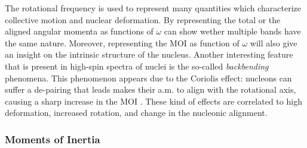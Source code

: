 The rotational frequency is used to represent many quantities which characterize collective motion and nuclear deformation. By representing the total or the aligned angular momenta as functions of $\omega$ can show wether multiple bands have the same nature. Moreover, representing the MOI as function of $\omega$ will also give an insight on the intrinsic structure of the nucleus. Another interesting feature that is present in high-spin spectra of nuclei is the so-called \emph{backbending} phenomena. This phenomenon appears due to the Coriolis effect: nucleons can suffer a de-pairing that leads makes their a.m. to align with the rotational axis, causing a sharp increase in the MOI \cite{ring2004nuclear,kvasil2004backbending}. These kind of effects are correlated to high deformation, increased rotation, and change in the nucleonic alignment.

\subsubsection{Moments of Inertia}

